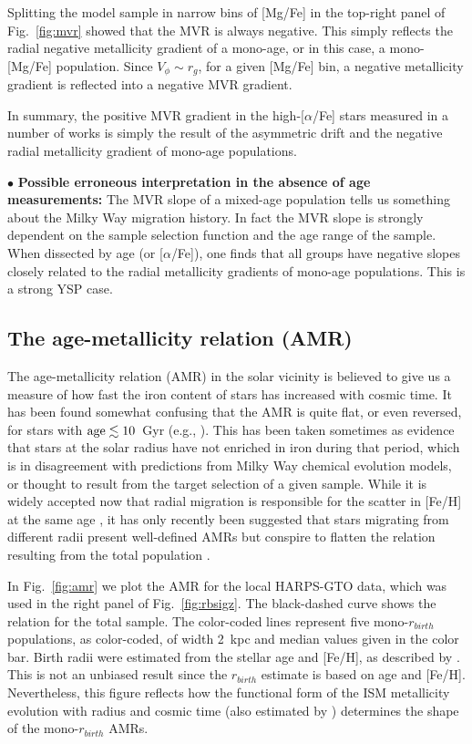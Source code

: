 \documentclass[usenatbib]{mnras}
\begin{document}
Splitting the model sample in narrow bins of [Mg/Fe] in the top-right panel of Fig.~\ref{fig:mvr} showed that the MVR is always negative. This simply reflects the radial negative metallicity gradient of a mono-age, or in this case, a mono-[Mg/Fe] population. Since $V_\phi\sim r_g$, for a given [Mg/Fe] bin, a negative metallicity gradient is reflected into a negative MVR gradient. 

In summary, the positive MVR gradient in the high-[$\alpha$/Fe] stars measured in a number of works \citep{carney90,rocha-pinto06,spagna10,lee11,adibekyan13,allende-prieto16} is simply the result of the asymmetric drift and the negative radial metallicity gradient of mono-age populations.

$\bullet$ {\bf Possible erroneous interpretation in the absence of age measurements:} The MVR slope of a mixed-age population tells us something about the Milky Way migration history. In fact the MVR slope is strongly dependent on the sample selection function and the age range of the sample. When dissected by age (or [$\alpha$/Fe]), one finds that all groups have negative slopes closely related to the radial metallicity gradients of mono-age populations. This is a strong YSP case.


\subsection{The age-metallicity relation (AMR)}
\label{sec:amr}

The age-metallicity relation (AMR) in the solar vicinity is believed to give us a measure of how fast the iron content of stars has increased with cosmic time. It has been found somewhat confusing that the AMR is quite flat, or even reversed, for stars with $\rm age\lesssim10$~Gyr (e.g., \citealt{edvardsson93, lin18,vickers18}). This has been taken sometimes as evidence that stars at the solar radius have not enriched in iron during that period, which is in disagreement with predictions from Milky Way chemical evolution models, or thought to result from the target selection of a given sample. While it is widely accepted now that radial migration is responsible for the scatter in [Fe/H] at the same age \citep{sellwood02,roskar08a, schonrich09a}, it has only recently been suggested that stars migrating from different radii present well-defined AMRs but conspire to flatten the relation resulting from the total population \citep{minchev18}.



In Fig.~\ref{fig:amr} we plot the AMR for the local HARPS-GTO data, which was used in the right panel of Fig.~\ref{fig:rbsigz}. The black-dashed curve shows the relation for the total sample. The color-coded lines represent five mono-$r_{birth}$ populations, as color-coded, of width 2~kpc and median values given in the color bar. Birth radii were estimated from the stellar age and [Fe/H], as described by \cite{minchev18}. This is not an unbiased result since the $r_{birth}$ estimate is based on age and [Fe/H]. Nevertheless, this figure reflects how the functional form of the ISM metallicity evolution with radius and cosmic time (also estimated by \citealt{minchev18}) determines the shape of the mono-$r_{birth}$ AMRs.
\end{document}
